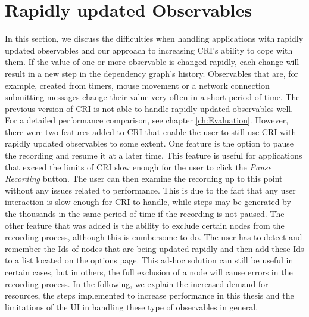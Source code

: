 \section{Rapidly updated Observables}
\label{sec:RapidlyUpdatedObservables}
In this section, we discuss the difficulties when handling applications with rapidly updated observables and our approach to increasing CRI's ability to cope with them. If the value of one or more observable is changed rapidly, each change will result in a new step in the dependency graph's history. Observables that are, for example, created from timers, mouse movement or a network connection submitting messages change their value very often in a short period of time. The previous version of CRI is not able to handle rapidly updated observables well. For a detailed performance comparison, see chapter \ref{ch:Evaluation}. However, there were two features added to CRI that enable the user to still use CRI with rapidly updated observables to some extent. One feature is the option to pause the recording and resume it at a later time. This feature is useful for applications that exceed the limits of CRI slow enough for the user to click the \emph{Pause Recording} button. The user can then examine the recording up to this point without any issues related to performance. This is due to the fact that any user interaction is slow enough for CRI to handle, while steps may be generated by the thousands in the same period of time if the recording is not paused. The other feature that was added is the ability to exclude certain nodes from the recording process, although this is cumbersome to do. The user has to detect and remember the Ids of nodes that are being updated rapidly and then add these Ids to a list located on the options page. This ad-hoc solution can still be useful in certain cases, but in others, the full exclusion of a node will cause errors in the recording process. In the following, we explain the increased demand for resources, the steps implemented to increase performance in this thesis and the limitations of the UI in handling these type of observables in general. 

